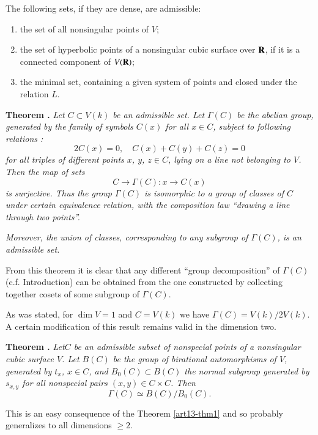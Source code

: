 The following sets, if they are dense, are admissible:
\begin{enumerate}
\item the set of all nonsingular points of $V$;

\item the set of hyperbolic points of a nonsingular cubic surface over $\mathbf{R}$, if it is a connected component of $V(\mathbf{R})$;

\item the minimal set, containing a given system of points and closed under the relation $L$.
\end{enumerate}

\medskip
\noindent
{\bf Theorem .\label{art13-thm3}}
{\em Let $C\subset V(k)$ be an admissible set. Let $\Gamma(C)$ be the abelian group, generated by the family of symbols $C(x)$ for all $x\in C$, subject to following relations :}
\begin{equation*}
2C(x)=0,\quad C(x)+C(y)+C(z)=0\tag{3}\label{art13-eq3}
\end{equation*}
{\em for all triples of different points $x$, $y$, $z\in C$, lying on a line not belonging to $V$. Then the map of sets}
$$
C\to \Gamma(C):x\to C(x)
$$
{\em is surjective. Thus the group $\Gamma(C)$ is isomorphic to a group of classes of $C$ under certain equivalence relation, with the composition law ``drawing a line through two points''.}

{\em Moreover, the union of classes, corresponding to any subgroup of $\Gamma(C)$, is an admissible set.}
\smallskip

From this theorem it is clear that any different ``group decomposition'' of $\Gamma(C)$ (c.f. Introduction) can be obtained from the one constructed by collecting together cosets of some subgroup of $\Gamma(C)$. 

As was stated, for $\dim V=1$ and $C=V(k)$ we have $\Gamma(C)=V(k)/2V(k)$. A certain modification of this result remains valid in the dimension two.

\medskip
\noindent
{\bf Theorem .\label{art13-thm4}}
{\em Let\pageoriginale $C$ be an admissible subset of nonspecial points of a nonsingular cubic surface $V$. Let $B(C)$ be the group of birational automorphisms of $V$, generated by $t_{x}$, $x\in C$, and $B_{0}(C)\subset B(C)$ the normal subgroup generated by $s_{x,y}$ for all nonspecial pairs $(x,y)\in C\times C$. Then}
$$
\Gamma(C)\simeq B(C)/B_{0}(C).
$$
\smallskip

This is an easy consequence of the Theorem \ref{art13-thm1} and so probably generalizes to all dimensions $\geq 2$.

